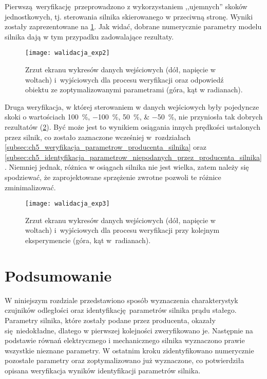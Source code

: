 Pierwszą weryfikację przeprowadzono z wykorzystaniem ,,ujemnych'' skoków jednostkowych, tj. sterowania silnika skierowanego w przeciwną stronę. Wyniki zostały zaprezentowane na \cref{fig:silnik_weryfikacja_parametrow}. Jak widać, dobrane numerycznie parametry modelu silnika dają w tym przypadku zadowalające rezultaty.

\begin{figure}[h]
    \centering
    \texttt{[image: walidacja\_exp2]}
    \caption{Zrzut ekranu wykresów danych wejściowych (dół, napięcie w woltach) i~wyjściowych dla procesu weryfikacji oraz odpowiedź obiektu ze zoptymalizowanymi parametrami (góra, kąt w radianach).}
    \label{fig:silnik_weryfikacja_parametrow}
\end{figure}

Druga weryfikacja, w której sterowaniem w danych wejściowych były pojedyncze skoki o wartościach \SIlist{100;-100;50;-50}{\percent}, nie przyniosła tak dobrych rezultatów (\cref{fig:silnik_nieudana_weryfikacja_parametrow}). Być może jest to wynikiem osiągania innych prędkości ustalonych przez silnik, co zostało zaznaczone wcześniej w~rozdziałach \ref{subsec:ch5_weryfikacja_parametrow_producenta_silnika} oraz \ref{subsec:ch5_identyfikacja_parametrow_niepodanych_przez_producenta_silnika}. Niemniej jednak, różnica w osiągach silnika nie jest wielka, zatem należy się spodziewać, że zaprojektowane sprzężenie zwrotne pozwoli te różnice zminimalizować.

\begin{figure}[h]
    \centering
    \texttt{[image: walidacja\_exp3]}
    \caption{Zrzut ekranu wykresów danych wejściowych (dół, napięcie w woltach) i~wyjściowych dla procesu weryfikacji przy kolejnym eksperymencie (góra, kąt w~radianach).}
    \label{fig:silnik_nieudana_weryfikacja_parametrow}
\end{figure}

\section{Podsumowanie}

W niniejszym rozdziale przedstawiono sposób wyznaczenia charakterystyk czujników odległości oraz identyfikację parametrów silnika prądu stałego. Parametry silnika, które zostały podane przez producenta, okazały się niedokładne, dlatego w pierwszej kolejności zweryfikowano je. Następnie na podstawie równań elektrycznego i mechanicznego silnika wyznaczono prawie wszystkie nieznane parametry. W ostatnim kroku zidentyfikowano numerycznie pozostałe parametry oraz zoptymalizowano już wyznaczone, co potwierdziła opisana weryfikacja wyników identyfikacji parametrów silnika.


